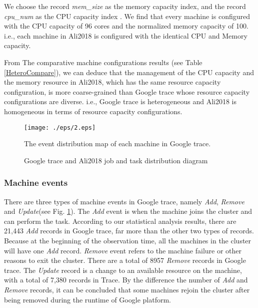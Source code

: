 \documentclass[conference]{IEEEtran}
\begin{document}
We choose the record \emph{mem\_size} as the memory capacity index, and the record \emph{cpu\_num} as the CPU capacity index . We find that every machine is configured with the CPU capacity of 96 cores and the normalized memory capacity of 100. i.e.,  each machine in Ali2018 is configured with the identical CPU and Memory capacity.

 From The comparative machine configurations results (see Table \ref{HeteroCompare}), we can deduce  that the management of the CPU capacity and  the memory resource in Ali2018, which has the same resource capacity configuration, is more coarse-grained  than Google trace whose resource capacity configurations are diverse. i.e., Google trace is heterogeneous and Ali2018 is homogeneous in terms of resource capacity configurations.
\begin{figure}[htbp]
\centerline{\texttt{[image: ./eps/2.eps]}}
\caption{The event distribution map of each machine in Google trace.}
\label{Fig:EventDistr}
\end{figure}
\begin{figure*}[htp]
\centering     %
{}
\caption{Google trace and Ali2018 job and task distribution diagram}
\label{JobandTaskDistribution}
\end{figure*}
\subsubsection{Machine events}

There are three types of machine events in Google trace, namely \emph{Add}, \emph{Remove} and \emph{Update}(see Fig. \ref{Fig:EventDistr}). The \emph{Add} event is when the machine joins the cluster and can perform the task. According to our statistical analysis results, there are 21,443 \emph{Add} records in Google trace, far more than the other two types of records. Because at the beginning of the observation time, all the machines in the cluster will have one \emph{Add} record. \emph{Remove} event refers to the machine failure or other reasons to exit the cluster. There are a total of 8957 \emph{Remove} records in Google trace. The \emph{Update} record is a change to an available resource on the machine, with a total of 7,380 records in Trace. By the difference the number of \emph{Add} and \emph{Remove} records, it can be concluded that some machines rejoin the cluster after being removed during the runtime of Google platform.
\end{document}
